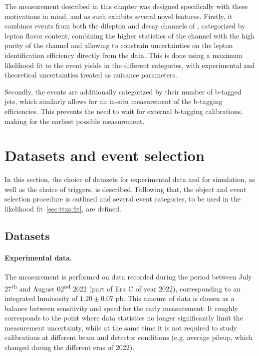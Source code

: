 The measurement described in this chapter was designed specifically with these motivations in mind, and as such exhibits several novel features. Firstly, it combines events from both the dilepton and \ljets decay channels of \ttbar, categorized by lepton flavor content, combining the higher statistics of the \ljets channel with the high purity of the \emu channel and allowing to constrain uncertainties on the lepton identification efficiency directly from the data. This is done using a maximum likelihood fit to the event yields in the different categories, with experimental and theoretical uncertainties treated as nuisance parameters.

Secondly, the events are additionally categorized by their number of b-tagged jets, which similarly allows for an in-situ measurement of the b-tagging efficiencies. This prevents the need to wait for external b-tagging calibrations, making for the earliest possible measurement.

\section{Datasets and event selection}

In this section, the choice of datasets for experimental data and for simulation, as well as the choice of triggers, is described. Following that, the object and event selection procedure is outlined and several event categories, to be used in the likelihood fit~\ref{sec:ttxs:fit}, are defined. 

\subsection{Datasets}

\paragraph{Experimental data.}
The measurement is performed on data recorded during the period between July 27\textsuperscript{th} and August 02\textsuperscript{nd} 2022 (part of Era C of year 2022), corresponding to an integrated luminosity of $1.20 \pm 0.07$ pb. This amount of data is chosen as a balance between sensitivity and speed for the early measurement: It roughly corresponds to the point where data statistics no longer significantly limit the measurement uncertainty, while at the same time it is not required to study calibrations at different beam and detector conditions (e.g. average pileup, which changed during the different eras of 2022).

